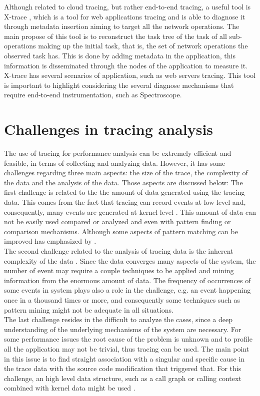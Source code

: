 Although related to cloud tracing, but rather end-to-end tracing, a useful tool is X-trace \cite{Fonseca2007XPN19734301973450}, which is a tool for web applications tracing and is able to diagnose it through metadata insertion aiming to target all the network operations. The main propose of this tool is to reconstruct the task tree of the task of all sub-operations making up the initial task, that is, the set of network operations the observed task has. This is done by adding metadata in the application, this information is disseminated through the nodes of the application to measure it. X-trace has several scenarios of application, such as web servers tracing. This tool is important to highlight considering the several diagnose mechanisms that require end-to-end instrumentation, such as Spectroscope.\\
\section{Challenges in tracing analysis}
The use of tracing for performance analysis can be extremely efficient and feasible, in terms of collecting and analyzing data. However, it has some challenges regarding three main aspects: the size of the trace, the complexity of the data and the analysis of the data. Those aspects are discussed below:
The first challenge is related to the the amount of data generated using the tracing data. This comes from the fact that tracing can record events at low level and, consequently, many events are generated at kernel level \cite{giraldeau-ols2011}. This amount of data can not be easily used compared or analyzed and even with pattern finding or comparison mechanisms. Although some aspects of pattern matching can be improved has emphasized by \cite{similarity_based}.\\
The second challenge related to the analysis of tracing data is the inherent complexity of the data \cite{giraldeau-ols2011}. Since the data converges many aspects of the system, the number of event may require a couple techniques to be applied and mining information from the enormous amount of data. The frequency of occurrences of some events in system plays also a role in the challenge, e.g. an event happening once in a thousand times or more, and consequently some techniques such as pattern mining might not be adequate in all situations.\\
The last challenge resides in the difficult to analyze the cases, since a deep understanding of the underlying mechanisms of the system are necessary. For some performance issues the root cause of the problem is unknown and to profile all the application may not be trivial, thus tracing can be used. The main point in this issue is to find straight association with a singular and specific cause in the trace data with the source code modification that triggered that. For this challenge, an high level data structure, such as a call graph or calling context combined with kernel data might be used \cite{doray_article}. 
